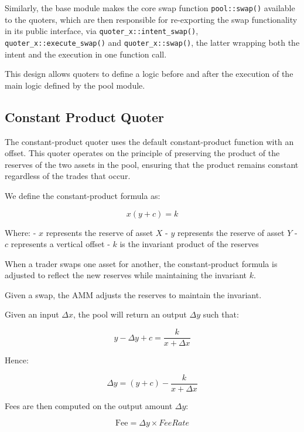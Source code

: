 \documentclass[sigconf,nonacm,prologue,table]{acmart}
\numberwithin{equation}{section}
\theoremstyle{definition}
\theoremstyle{remark}
\begin{document}
Similarly, the base module makes the core swap function \verb|pool::swap()| available to the quoters, which are then responsible for re-exporting the swap functionality in its public interface, via \verb|quoter_x::intent_swap()|, \verb|quoter_x::execute_swap()| and \verb|quoter_x::swap()|, the latter wrapping both the intent and the execution in one function call.

This design allows quoters to define a logic before and after the execution of the main logic defined by the pool module.

\subsection{Constant Product Quoter} \label{cpquoter}

The constant-product quoter uses the default constant-product function with an offset. This quoter operates on the principle of preserving the product of the reserves of the two assets in the pool, ensuring that the product remains constant regardless of the trades that occur.

We define the constant-product formula as:

\begin{equation}
x(y+c)=k
\end{equation}

Where:
- $x$ represents the reserve of asset $X$
- $y$ represents the reserve of asset $Y$
- $c$ represents a vertical offset
- $k$ is the invariant product of the reserves

When a trader swaps one asset for another, the constant-product formula is adjusted to reflect the new reserves while maintaining the invariant $k$.

Given a swap, the AMM adjusts the reserves to maintain the invariant. 

Given an input $\Delta x$, the pool will return an output $\Delta y$ such that:

\begin{equation}
y - \Delta y + c = \frac{k}{x + \Delta x}
\end{equation}

Hence:

\begin{equation}
\Delta y = (y + c) - \frac{k}{x + \Delta x}
\end{equation}


Fees are then computed on the output amount $\Delta y$:

\begin{equation}
\text{Fee} = \Delta y \times Fee Rate
\end{equation}
\end{document}
